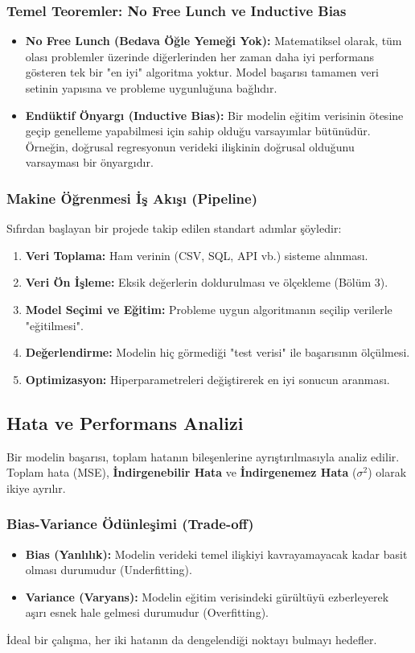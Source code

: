 \documentclass[12pt,a4paper]{article}
\begin{document}
\subsubsection{Temel Teoremler: No Free Lunch ve Inductive Bias}
\begin{itemize}
    \item \textbf{No Free Lunch (Bedava Öğle Yemeği Yok):} Matematiksel olarak, tüm olası problemler üzerinde diğerlerinden her zaman daha iyi performans gösteren tek bir "en iyi" algoritma yoktur. Model başarısı tamamen veri setinin yapısına ve probleme uygunluğuna bağlıdır.
    \item \textbf{Endüktif Önyargı (Inductive Bias):} Bir modelin eğitim verisinin ötesine geçip genelleme yapabilmesi için sahip olduğu varsayımlar bütünüdür. Örneğin, doğrusal regresyonun verideki ilişkinin doğrusal olduğunu varsayması bir önyargıdır.
\end{itemize}

\subsubsection{Makine Öğrenmesi İş Akışı (Pipeline)}
Sıfırdan başlayan bir projede takip edilen standart adımlar şöyledir:
\begin{enumerate}
    \item \textbf{Veri Toplama:} Ham verinin (CSV, SQL, API vb.) sisteme alınması.
    \item \textbf{Veri Ön İşleme:} Eksik değerlerin doldurulması ve ölçekleme (Bölüm 3).
    \item \textbf{Model Seçimi ve Eğitim:} Probleme uygun algoritmanın seçilip verilerle "eğitilmesi".
    \item \textbf{Değerlendirme:} Modelin hiç görmediği "test verisi" ile başarısının ölçülmesi.
    \item \textbf{Optimizasyon:} Hiperparametreleri değiştirerek en iyi sonucun aranması.
\end{enumerate}

\newpage
\subsection{Hata ve Performans Analizi}
Bir modelin başarısı, toplam hatanın bileşenlerine ayrıştırılmasıyla analiz edilir. Toplam hata (MSE), \textbf{İndirgenebilir Hata} ve \textbf{İndirgenemez Hata} ($\sigma^2$) olarak ikiye ayrılır.

\subsubsection{Bias-Variance Ödünleşimi (Trade-off)}
\begin{itemize}
    \item \textbf{Bias (Yanlılık):} Modelin verideki temel ilişkiyi kavrayamayacak kadar basit olması durumudur (Underfitting).
    \item \textbf{Variance (Varyans):} Modelin eğitim verisindeki gürültüyü ezberleyerek aşırı esnek hale gelmesi durumudur (Overfitting).
\end{itemize}
İdeal bir çalışma, her iki hatanın da dengelendiği noktayı bulmayı hedefler.
\end{document}
